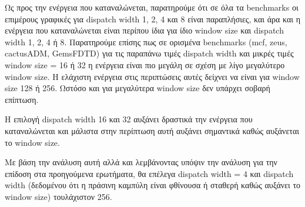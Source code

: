    Ως προς την ενέργεια που καταναλώνεται, παρατηρούμε ότι σε όλα τα benchmarks
   οι επιμέρους γραφικές για dispatch width 1, 2, 4 και 8 είναι παραπλήσιες, και
   άρα και η ενέργεια που καταναλώνεται είναι περίπου ίδια για ίδιο window size
   και dispatch width  1, 2, 4 ή 8. Παρατηρούμε επίσης πως σε ορισμένα
   benchmarks (mcf, zeus, cactusADM, GemsFDTD) για τις παραπάνω τιμές dispatch
   width και μικρές τιμές window size = 16 ή 32 η ενέργεια είναι πιο μεγάλη σε
   σχέση με λίγο μεγαλύτερο window size. Η ελάχιστη ενέργεια στις περιπτώσεις
   αυτές δείχνει να είναι για window size 128 ή 256. Ωστόσο και για μεγαλύτερα window size δεν υπάρχει σοβαρή επίπτωση.
  
   Η επιλογή dispatch width 16 και 32 αυξάνει δραστικά την ενέργεια που
   καταναλώνεται και μάλιστα στην περίπτωση αυτή αυξάνει σημαντικά καθώς
   αυξάνεται το window size. 
   
   Με βάση την ανάλυση αυτή αλλά και λεμβάνοντας υπόψιν την ανάλυση για την
   επίδοση στα προηγούμενα ερωτήματα, θα επέλεγα dispatch width = 4 και dispatch
   width (δεδομένου ότι η πράσινη καμπύλη είναι φθίνουσα ή σταθερή καθώς αυξάνει
   το window size) τουλάχιστον 256.